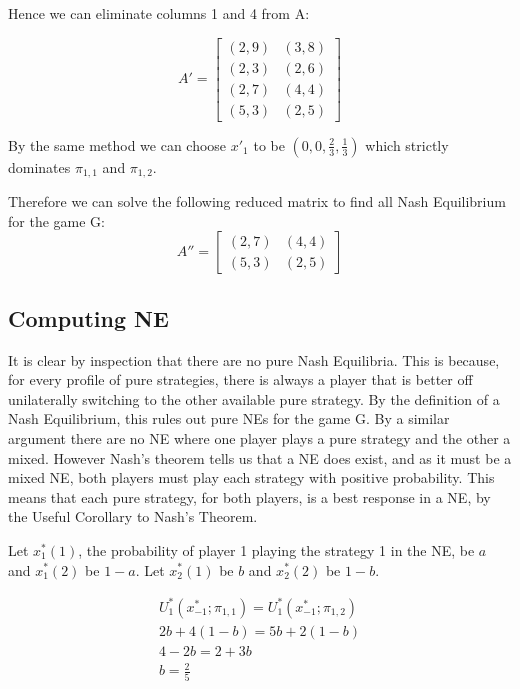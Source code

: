 \documentclass[11pt]{article}
\begin{document}
Hence we can eliminate columns 1 and 4 from A:

\begin{equation}
  A' = 
  \begin{bmatrix}
    (2,9) & (3,8) \\
    (2,3) & (2,6) \\
    (2,7) & (4,4) \\
    (5,3) & (2,5)
  \end{bmatrix}
\end{equation}

By the same method we can choose $x'_1$ to be $(0,0,\frac{2}{3},\frac{1}{3})$ which strictly dominates $\pi_{1,1}$ and $\pi_{1,2}$.

Therefore we can solve the following reduced matrix to find all Nash Equilibrium for the game G:
\begin{equation}
  A'' = 
  \begin{bmatrix}
    (2,7) & (4,4) \\
    (5,3) & (2,5)
  \end{bmatrix}
\end{equation}

\subsection{Computing NE}

It is clear by inspection that there are no pure Nash Equilibria. This is because, for every profile of pure strategies, there is always a player that is better off unilaterally switching to the other available pure strategy. By the definition of a Nash Equilibrium, this rules out pure NEs for the game G. By a similar argument there are no NE where one player plays a pure strategy and the other a mixed. However Nash's theorem tells us that a NE does exist, and as it must be a mixed NE, both players must play each strategy with positive probability. This means that each pure strategy, for both players, is a best response in a NE, by the Useful Corollary to Nash's Theorem.

Let $x^*_1(1)$, the probability of player 1 playing the strategy 1 in the NE, be $a$ and $x^*_1(2)$ be $1-a$. Let $x^*_2(1)$ be $b$ and $x^*_2(2)$ be $1-b$.

\begin{align}
  U^*_1(x^*_{-1};\pi_{1,1}) = U^*_1(x^*_{-1};\pi_{1,2}) \\
  2b + 4(1-b) = 5b + 2(1-b) \\
  4 - 2b = 2 + 3b \\
  b = \frac{2}{5}
\end{align}
\end{document}
